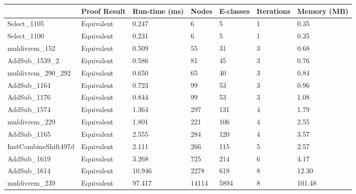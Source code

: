 \begin{tabular}{lllllll}
\toprule
 & Proof Result & Run-time (ms) & Nodes & E-classes & Iterations & Memory (MB) \\
\midrule
Select\_1105 & Equivalent & 0.247 & 6 & 5 & 1 & 0.35 \\
Select\_1100 & Equivalent & 0.231 & 6 & 5 & 1 & 0.35 \\
muldivrem\_152 & Equivalent & 0.509 & 55 & 31 & 3 & 0.68 \\
AddSub\_1539\_2 & Equivalent & 0.586 & 81 & 45 & 3 & 0.76 \\
muldivrem\_290\_292 & Equivalent & 0.650 & 65 & 40 & 3 & 0.84 \\
AddSub\_1164 & Equivalent & 0.723 & 99 & 53 & 3 & 0.96 \\
AddSub\_1176 & Equivalent & 0.844 & 99 & 53 & 3 & 1.08 \\
AddSub\_1574 & Equivalent & 1.364 & 297 & 131 & 4 & 1.79 \\
muldivrem\_229 & Equivalent & 1.801 & 221 & 106 & 4 & 2.55 \\
AddSub\_1165 & Equivalent & 2.555 & 284 & 120 & 4 & 3.57 \\
InstCombineShift497d & Equivalent & 2.111 & 266 & 115 & 5 & 2.57 \\
AddSub\_1619 & Equivalent & 3.268 & 725 & 214 & 6 & 4.17 \\
AddSub\_1614 & Equivalent & 10.946 & 2278 & 618 & 8 & 12.30 \\
muldivrem\_239 & Equivalent & 97.417 & 14114 & 5894 & 8 & 101.48 \\
\bottomrule
\end{tabular}
